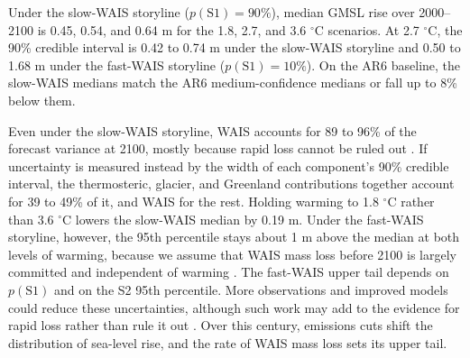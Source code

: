 \documentclass[draft,linenumbers]{agujournal2025}
\begin{document}
Under the slow-WAIS storyline ($p(\mathrm{S1}) = 90\%$), median GMSL rise over 2000--2100 is 0.45, 0.54, and 0.64 m for the 1.8, 2.7, and 3.6 $^\circ$C scenarios. At 2.7 $^\circ$C, the 90\% credible interval is 0.42 to 0.74 m under the slow-WAIS storyline and 0.50 to 1.68 m under the fast-WAIS storyline ($p(\mathrm{S1}) = 10\%$). On the AR6 baseline, the slow-WAIS medians match the AR6 medium-confidence medians or fall up to 8\% below them.

Even under the slow-WAIS storyline, WAIS accounts for 89 to 96\% of the forecast variance at 2100, mostly because rapid loss cannot be ruled out \citep{Fox-Kemper2021}. If uncertainty is measured instead by the width of each component's 90\% credible interval, the thermosteric, glacier, and Greenland contributions together account for 39 to 49\% of it, and WAIS for the rest. Holding warming to 1.8 $^\circ$C rather than 3.6 $^\circ$C lowers the slow-WAIS median by 0.19 m. Under the fast-WAIS storyline, however, the 95th percentile stays about 1 m above the median at both levels of warming, because we assume that WAIS mass loss before 2100 is largely committed and independent of warming \citep{Naughten2023,Coulon2024,Rosier2025,Williams2026}. The fast-WAIS upper tail depends on $p(\mathrm{S1})$ and on the S2 95th percentile. More observations and improved models could reduce these uncertainties, although such work may add to the evidence for rapid loss rather than rule it out \citep{Fricker2025,Millman2026}. Over this century, emissions cuts shift the distribution of sea-level rise, and the rate of WAIS mass loss sets its upper tail.


\end{document}
